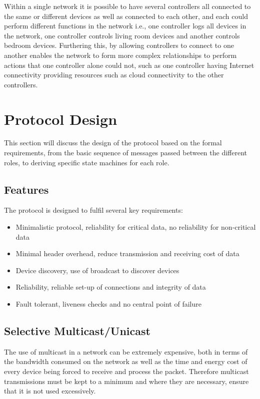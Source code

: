Within a single network it is possible to have several controllers all connected to the same or different devices as well as connected to each other, and each could perform different functions in the network i.e., one controller logs all devices in the network, one controller controls living room devices and another controls bedroom devices. Furthering this, by allowing controllers to connect to one another enables the network to form more complex relationships to perform actions that one controller alone could not, such as one controller having Internet connectivity providing resources such as cloud connectivity to the other controllers.


\section{Protocol Design} %
\label{sec:protocol_design}
This section will discuss the design of the protocol based on the formal requirements, from the basic sequence of messages passed between the different roles, to deriving specific state machines for each role.

\subsection{Features} %
\label{sub:features}
The protocol is designed to fulfil several key requirements:
\begin{itemize}
	\item Minimalistic protocol, reliability for critical data, no reliability for non-critical data
	\item Minimal header overhead, reduce transmission and receiving cost of data
	\item Device discovery, use of broadcast to discover devices
	\item Reliability, reliable set-up of connections and integrity of data
	\item Fault tolerant, liveness checks and no central point of failure
\end{itemize}

\subsection{Selective Multicast/Unicast} %
\label{sub:selective_multicast_unicast}
The use of multicast in a network can be extremely expensive, both in terms of the bandwidth consumed on the network as well as the time and energy cost of every device being forced to receive and process the packet. Therefore multicast transmissions must be kept to a minimum and where they are necessary, ensure that it is not used excessively.


